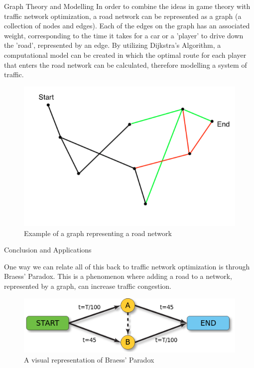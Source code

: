 \documentclass[final]{beamer}
\newlength{\onecolwid}
\begin{document}
\begin{frame}[t]
\begin{columns}[t]
\begin{column}{\onecolwid}
\begin{block}{Graph Theory and Modelling}
In order to combine the ideas in game theory with traffic network optimization, a road network can be represented as a graph (a collection of nodes and edges). Each of the edges on the graph has an associated weight, corresponding to the time it takes for a car or a 'player' to drive down the 'road', represented by an edge. By utilizing Dijkstra's Algorithm, a computational model can be created in which the optimal route for each player that enters the road network can be calculated, therefore modelling a system of traffic.

\end{block}

\begin{figure}
\includegraphics[width=0.8\linewidth]{graph.png}
\caption{Example of a graph representing a road network}
\end{figure}

\begin{block}{Conclusion and Applications}

One way we can relate all of this back to traffic network optimization is through Braess' Paradox. This is a phenomenon where adding a road to a network, represented by a graph, can increase traffic congestion.

\begin{figure}
\includegraphics[width=0.8\linewidth]{braess.png}
\caption{A visual representation of Braess' Paradox}
\end{figure}


\end{block}
\end{column}
\end{columns}
\end{frame}
\end{document}
